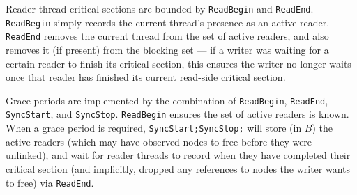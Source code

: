 Reader thread critical sections are
bounded by \lstinline|ReadBegin| and \lstinline|ReadEnd|.  \lstinline|ReadBegin| simply records the current thread's presence as an active reader.
\lstinline|ReadEnd| removes the current thread from the set of active readers, and also removes it (if present) from the blocking set --- if a writer was waiting for a certain reader to finish its critical section, this ensures the writer no longer waits once that reader has finished its current read-side critical section.

Grace periods are implemented by the combination of \lstinline|ReadBegin|, \lstinline|ReadEnd|, \lstinline|SyncStart|, and \lstinline|SyncStop|.
\lstinline|ReadBegin| ensures the set of active readers is known.  When a grace period is required, \lstinline|SyncStart;SyncStop;| will store (in $B$) the active readers (which may have observed nodes to free before they were unlinked), and wait for reader threads to record when they have completed their critical section (and implicitly, dropped any references to nodes the writer wants to free) via \lstinline|ReadEnd|.

